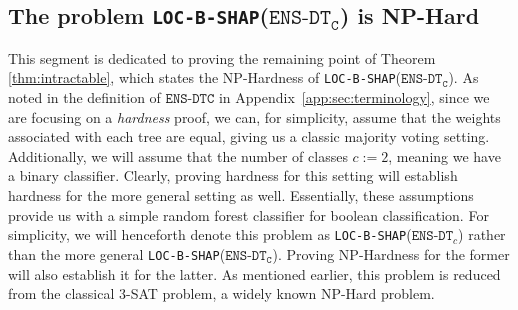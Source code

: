 \subsection{The problem \texttt{LOC-B-SHAP}($\texttt{ENS-DT}_{\texttt{C}}$) is NP-Hard} \label{app:subsec:bshaprf}
This segment is dedicated to proving the remaining point of Theorem \ref{thm:intractable}, which states the NP-Hardness of \texttt{LOC-B-SHAP}($\texttt{ENS-DT}_{\texttt{C}}$). As noted in the definition of $\texttt{ENS-DT}{\texttt{C}}$ in Appendix~\ref{app:sec:terminology}, since we are focusing on a \emph{hardness} proof, we can, for simplicity, assume that the weights associated with each tree are equal, giving us a classic majority voting setting. Additionally, we will assume that the number of classes $c:=2$, meaning we have a binary classifier. Clearly, proving hardness for this setting will establish hardness for the more general setting as well. Essentially, these assumptions provide us with a simple random forest classifier for boolean classification. For simplicity, we will henceforth denote this problem as \texttt{LOC-B-SHAP}($\texttt{ENS-DT}_{c}$) rather than the more general \texttt{LOC-B-SHAP}($\texttt{ENS-DT}_{\texttt{C}}$). Proving NP-Hardness for the former will also establish it for the latter. As mentioned earlier, this problem is reduced from the classical 3-SAT problem, a widely known NP-Hard problem.


